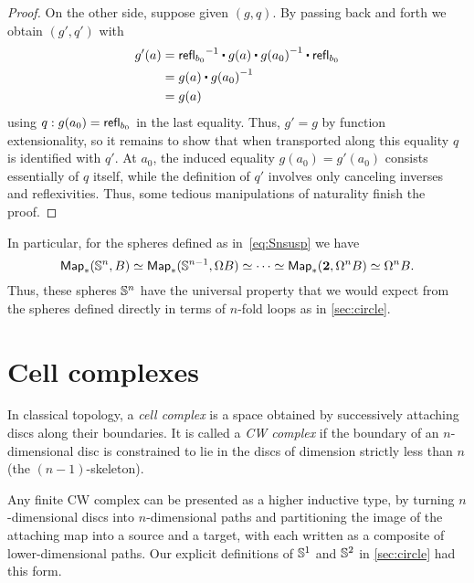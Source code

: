 \begin{proof}
  On the other side, suppose given $(g,q)$.
  By passing back and forth we obtain $(g',q')$ with
  \begin{align*}
    g'(a) &= \opp{\refl{b_0}} \ct g(a) \ct \opp{g(a_0)} \ct \refl{b_0}\\
    &= g(a) \ct \opp{g(a_0)}\\
    &= g(a)
  \end{align*}
  using $q:g(a_0) = \mathsf{refl}_{b_0}$ in the last equality.
  Thus, $g'=g$ by function extensionality, so it remains to show that when transported along this equality $q$ is identified with $q'$.
  At $a_0$, the induced equality $g(a_0)=g'(a_0)$ consists essentially of $q$ itself, while the definition of $q'$ involves only canceling inverses and reflexivities.
  Thus, some tedious manipulations of naturality finish the proof.
\end{proof}

%
In particular, for the spheres defined as in~\eqref{eq:Snsusp} we have
\[ \mathsf{Map}_*(\mathbb{S}^n,B) \simeq \mathsf{Map}_*(\mathbb{S}^{n-1}, \Omega B) \simeq \cdots \simeq \mathsf{Map}_*(\mathbf{2},\Omega^n B) \simeq \Omega^n B. \]
Thus, these spheres $\mathbb{S}^n$ have the universal property that we would expect from the spheres defined directly in terms of $n$-fold loops as in \autoref{sec:circle}.

%

\section{Cell complexes}
\label{sec:cell-complexes}

%
%
In classical topology, a \emph{cell complex} is a space obtained by successively attaching discs along their boundaries.
It is called a \emph{CW complex} if the boundary of an $n$-dimensional disc is constrained to lie in the discs of dimension strictly less than $n$ (the $(n-1)$-skeleton).

Any finite CW complex can be presented as a higher inductive type, by turning $n$-dimensional discs into $n$-dimensional paths and partitioning the image of the attaching map into a source and a target, with each written as a composite of lower-dimensional paths.
Our explicit definitions of $\mathbb{S}^1$ and $\mathbb{S}^2$ in \autoref{sec:circle} had this form.


